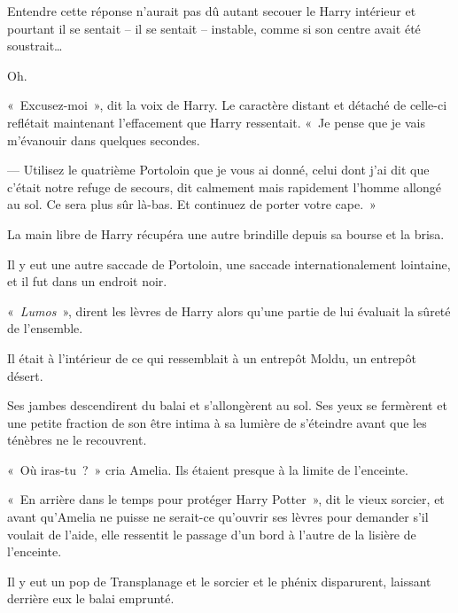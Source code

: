 Entendre cette réponse n'aurait pas dû autant secouer le Harry intérieur et pourtant il se sentait -- il se sentait -- instable, comme si son centre avait été soustrait…

Oh.

«~Excusez-moi~», dit la voix de Harry. Le caractère distant et détaché de celle-ci reflétait maintenant l'effacement que Harry ressentait. «~Je pense que je vais m'évanouir dans quelques secondes.

--- Utilisez le quatrième Portoloin que je vous ai donné, celui dont j'ai dit que c'était notre refuge de secours, dit calmement mais rapidement l'homme allongé au sol. Ce sera plus sûr là-bas. Et continuez de porter votre cape.~»

La main libre de Harry récupéra une autre brindille depuis sa bourse et la brisa.

Il y eut une autre saccade de Portoloin, une saccade internationalement lointaine, et il fut dans un endroit noir.

«~\emph{Lumos}~», dirent les lèvres de Harry alors qu'une partie de lui évaluait la sûreté de l'ensemble.

Il était à l'intérieur de ce qui ressemblait à un entrepôt Moldu, un entrepôt désert.

Ses jambes descendirent du balai et s'allongèrent au sol. Ses yeux se fermèrent et une petite fraction de son être intima à sa lumière de s'éteindre avant que les ténèbres ne le recouvrent.

\later

«~Où iras-tu~?~» cria Amelia. Ils étaient presque à la limite de l'enceinte.

«~En arrière dans le temps pour protéger Harry Potter~», dit le vieux sorcier, et avant qu'Amelia ne puisse ne serait-ce qu'ouvrir ses lèvres pour demander s'il voulait de l'aide, elle ressentit le passage d'un bord à l'autre de la lisière de l'enceinte.

Il y eut un pop de Transplanage et le sorcier et le phénix disparurent, laissant derrière eux le balai emprunté.

